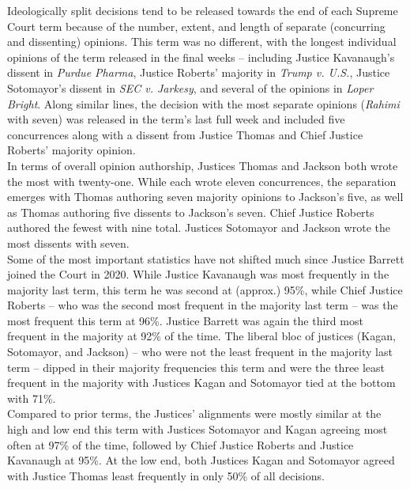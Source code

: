 Ideologically split decisions tend to be released towards the end of each Supreme Court term because of the number, extent, and length of separate (concurring and dissenting) opinions. This term was no different, with the longest individual opinions of the term released in the final weeks -- including Justice Kavanaugh’s dissent in \emph{Purdue Pharma}, Justice Roberts' majority in \emph{Trump v. U.S.}, Justice Sotomayor’s dissent in \emph{SEC v. Jarkesy}, and several of the opinions in \emph{Loper Bright}. Along similar lines, the decision with the most separate opinions (\emph{Rahimi} with seven) was released in the term’s last full week and included five concurrences along with a dissent from Justice Thomas and Chief Justice Roberts’ majority opinion. \\

In terms of overall opinion authorship, Justices Thomas and Jackson both wrote the most with twenty-one. While each wrote eleven concurrences, the separation emerges with Thomas authoring seven majority opinions to Jackson's five, as well as Thomas authoring five dissents to Jackson's seven. Chief Justice Roberts authored the fewest with nine total. Justices Sotomayor and Jackson wrote the most dissents with seven.  \\

Some of the most important statistics have not shifted much since Justice Barrett joined the Court in 2020. While Justice Kavanaugh was most frequently in the majority last term, this term he was second at (approx.) 95\%, while Chief Justice Roberts -- who was the second most frequent in the majority last term -- was the most frequent this term at 96\%. Justice Barrett was again the third most frequent in the majority at 92\% of the time. The liberal bloc of justices (Kagan, Sotomayor, and Jackson) -- who were not the least frequent in the majority last term -- dipped in their majority frequencies this term and were the three least frequent in the majority with Justices Kagan and Sotomayor tied at the bottom with 71\%. \\

Compared to prior terms, the Justices’ alignments were mostly similar at the high and low end this term with Justices Sotomayor and Kagan agreeing most often at 97\% of the time, followed by Chief Justice Roberts and Justice Kavanaugh at 95\%. At the low end, both Justices Kagan and Sotomayor agreed with Justice Thomas least frequently in only 50\% of all decisions. \\

